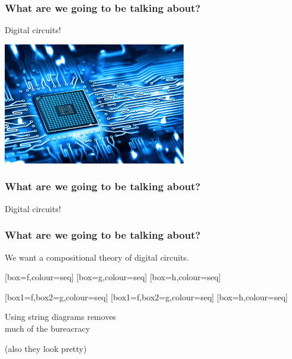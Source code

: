 \begin{frame}
    \frametitle{What are we going to be talking about?}
    \await
    \centering
    \LARGE
    Digital circuits!

    \includegraphics[width=0.6\textwidth]{imgs/circuit}
\end{frame}
\begin{frame}
    \frametitle{What are we going to be talking about?}
    \centering
    \LARGE
    Digital circuits!

    \vspace{1em}
    \normalsize

\end{frame}
\begin{frame}
    \frametitle{What are we going to be talking about?}

    \centering
    \Large
    We want a \alert{compositional} theory of digital circuits.

    \vspace{1em}

    \normalsize

    \await
    [box=f,colour=seq]
    \await
    \quad
    [box=g,colour=seq]
    \await
    \quad
    [box=h,colour=seq]

    \await
    \vspace{1em}

    [box1=f,box2=g,colour=seq]
    \quad
    [box1=f,box2=g,colour=seq]
    \quad
    [box=h,colour=seq]

    \await

    \Large
    \vspace{1em}

    Using \alert{string diagrams} removes \\ much of the bureacracy

    \await

    \normalsize

    (also they look pretty)

\end{frame}

